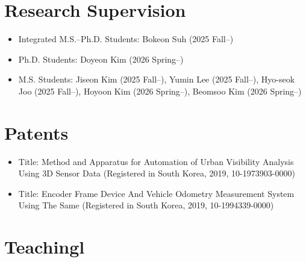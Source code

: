 \documentclass{cv} %
\begin{document}
\section{Research Supervision}
\begin{itemize}[label=$\cdot$]
  \item Integrated M.S.–Ph.D. Students: Bokeon Suh (2025 Fall--)
  \item Ph.D. Students: Doyeon Kim (2026 Spring--)
  \item M.S. Students: Jiseon Kim (2025 Fall--), Yumin Lee (2025 Fall--), Hyo-seok Joo (2025 Fall--), Hoyoon Kim (2026 Spring--), Beomsoo Kim (2026 Spring--)
\end{itemize}






\section{Patents}
\begin{itemize}[label=$\cdot$]
\item Title: Method and Apparatus for Automation of Urban Visibility Analysis Using 3D Sensor Data (Registered in South Korea, 2019, 10-1973903-0000)
\vspace{-1mm}
\item Title: Encoder Frame Device And Vehicle Odometry Measurement System Using The Same (Registered in South Korea, 2019, 10-1994339-0000)
\end{itemize} 


\section{Teachingl}
\end{document}
